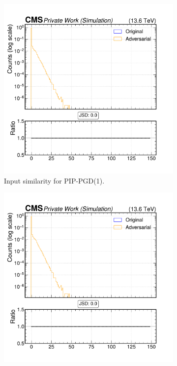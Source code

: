 \begin{figure}[h]
  \centering
  \begin{subfigure}[t]{0.32\textwidth}
    \includegraphics[width=\linewidth]{media/output/features/compare/combined_it_1/cmp_vtx_arr_sv_chi2.pdf}
    \caption*{Input similarity for PIP-PGD(1).}
  \end{subfigure}\hfill
  \begin{subfigure}[t]{0.32\textwidth}
    \includegraphics[width=\linewidth]{media/output/features/compare/combined_it_2/cmp_vtx_arr_sv_chi2.pdf}

\end{subfigure}
\end{figure}

